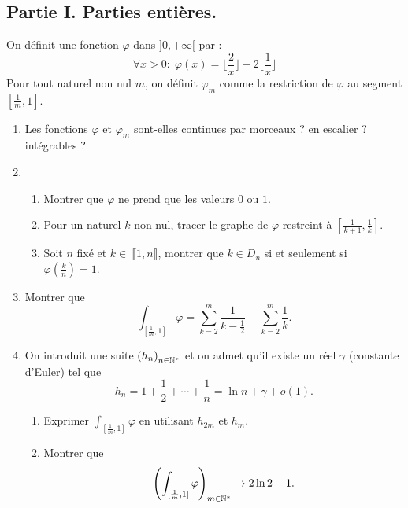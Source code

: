 \subsection*{Partie I. Parties entières.}
On définit une fonction $\varphi$ dans $]0,+\infty[$ par :
\begin{displaymath}
 \forall x>0 :\;\varphi(x) = \lfloor\frac{2}{x}\rfloor -2\lfloor \frac{1}{x} \rfloor
\end{displaymath}
Pour tout naturel non nul $m$, on définit $\varphi_m$ comme la restriction de $\varphi$ au segment $[\frac{1}{m},1]$.
 \begin{enumerate}
  \item Les fonctions $\varphi$ et $\varphi_m$ sont-elles continues par morceaux ? en escalier ? intégrables ?
  \item 
  \begin{enumerate}
    \item Montrer que $\varphi$ ne prend que les valeurs $0$ ou $1$.
    \item Pour un naturel $k$ non nul, tracer le graphe de $\varphi$ restreint à $[\frac{1}{k+1},\frac{1}{k}]$.
    \item Soit $n$ fixé et $k\in\ \llbracket 1, n\rrbracket$, montrer que $k\in D_n$ si et seulement si $\varphi(\frac{k}{n})=1$.
  \end{enumerate}
\item Montrer que 
\begin{displaymath}
 \int_{[\frac{1}{m},1]}\varphi = \sum_{k=2}^m\frac{1}{k-\frac{1}{2}} - \sum_{k=2}^m\frac{1}{k}.
\end{displaymath}
\item On introduit une suite $\left( h_n\right)_{n\in \mathbb{N}^*}$ et on admet qu'il existe un réel $\gamma$ (constante d'Euler) tel que
\begin{displaymath}
 h_n = 1+\frac{1}{2}+\cdots+\frac{1}{n} = \ln n + \gamma + o(1).
\end{displaymath}

\begin{enumerate}
 \item Exprimer $\int_{[\frac{1}{m},1]}\varphi$ en utilisant $h_{2m}$ et $h_m$.
 \item Montrer que
\begin{displaymath}
 \left(\int_{[\frac{1}{m},1]}\varphi \right)_{m\in \mathbb{N}^*} \rightarrow 2\ln2 -1 .
\end{displaymath}
\end{enumerate}
\end{enumerate}

